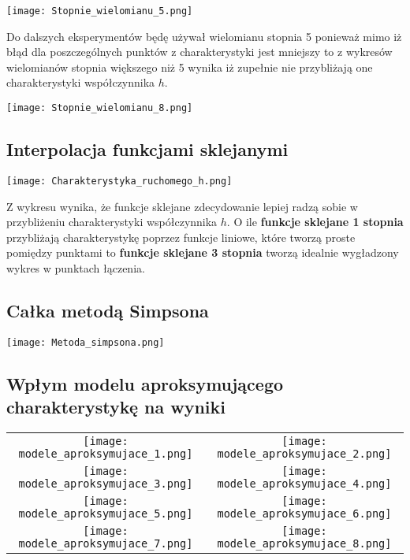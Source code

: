 \documentclass[varwidth,12pt,a4paper]{article}
\begin{document}
\texttt{[image: Stopnie\_wielomianu\_5.png]} 

Do dalszych eksperymentów będę używał wielomianu stopnia 5 ponieważ 
mimo iż błąd dla poszczególnych punktów z charakterystyki jest mniejszy to 
z wykresów wielomianów stopnia większego niż 5 wynika iż zupełnie nie przybliżają
one charakterystyki współczynnika $h$.


\texttt{[image: Stopnie\_wielomianu\_8.png]} 

\subsection{Interpolacja funkcjami sklejanymi}

\texttt{[image: Charakterystyka\_ruchomego\_h.png]} 

Z wykresu wynika, że funkcje sklejane zdecydowanie lepiej radzą sobie w przybliżeniu charakterystyki
współczynnika $h$. O ile \textbf{funkcje sklejane 1 stopnia} przybliżają charakterystykę poprzez funkcje
liniowe, które tworzą proste pomiędzy punktami to \textbf{funkcje sklejane 3 stopnia} tworzą idealnie
wygładzony wykres w punktach łączenia.

\subsection{Całka metodą Simpsona}

\texttt{[image: Metoda\_simpsona.png]} 

\subsection{Wpłym modelu aproksymującego charakterystykę na wyniki}

\begin{tabular}{cc}
    \texttt{[image: modele\_aproksymujace\_1.png]} &
    \texttt{[image: modele\_aproksymujace\_2.png]} \\
    \texttt{[image: modele\_aproksymujace\_3.png]} &
    \texttt{[image: modele\_aproksymujace\_4.png]} \\
    \texttt{[image: modele\_aproksymujace\_5.png]} &
    \texttt{[image: modele\_aproksymujace\_6.png]} \\
    \texttt{[image: modele\_aproksymujace\_7.png]} &
    \texttt{[image: modele\_aproksymujace\_8.png]} 
\end{tabular}
\end{document}
